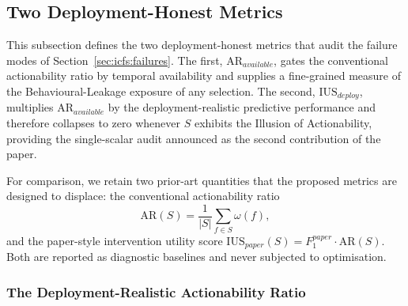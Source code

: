 \documentclass[a4paper,fleqn]{cas-sc}
\begin{document}
\subsection{Two Deployment-Honest Metrics}
\label{sec:icfs:metrics}

This subsection defines the two deployment-honest metrics that audit the failure modes of Section~\ref{sec:icfs:failures}. The first, $\mathrm{AR}_{available}$, gates the conventional actionability ratio by temporal availability and supplies a fine-grained measure of the Behavioural-Leakage exposure of any selection. The second, $\mathrm{IUS}_{deploy}$, multiplies $\mathrm{AR}_{available}$ by the deployment-realistic predictive performance and therefore collapses to zero whenever $S$ exhibits the Illusion of Actionability, providing the single-scalar audit announced as the second contribution of the paper.

For comparison, we retain two prior-art quantities that the proposed metrics are designed to displace: the conventional actionability ratio
\begin{equation}
    \mathrm{AR}(S) = \frac{1}{|S|}\sum_{f \in S}\omega(f),
    \label{eq:ar}
\end{equation}
and the paper-style intervention utility score $\mathrm{IUS}_{paper}(S) = F_1^{paper} \cdot \mathrm{AR}(S)$. Both are reported as diagnostic baselines and never subjected to optimisation.

\subsubsection{The Deployment-Realistic Actionability Ratio}
\label{sec:icfs:metrics:ar}
\end{document}
